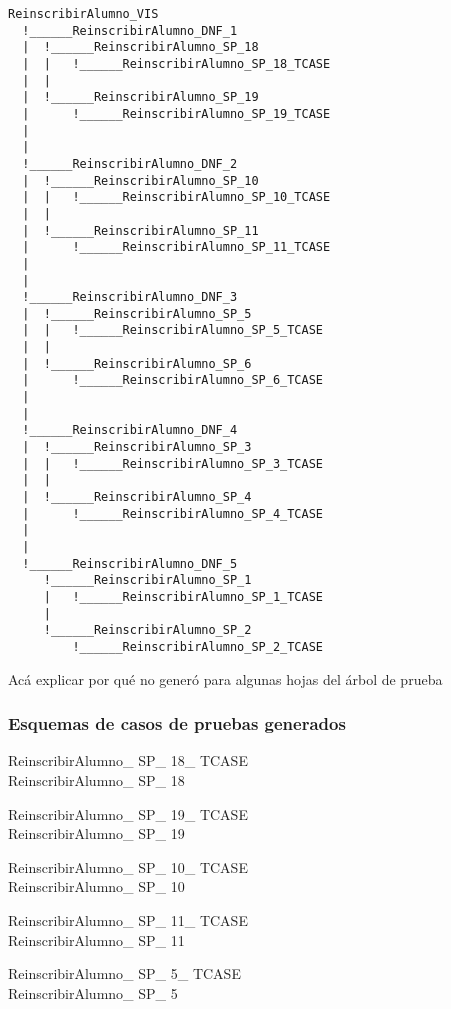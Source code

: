 \documentclass{article}
\begin{document}
\begin{verbatim}
ReinscribirAlumno_VIS
  !______ReinscribirAlumno_DNF_1
  |	 !______ReinscribirAlumno_SP_18
  |	 |	 !______ReinscribirAlumno_SP_18_TCASE
  |	 |
  |	 !______ReinscribirAlumno_SP_19
  |	 	 !______ReinscribirAlumno_SP_19_TCASE
  |	
  |
  !______ReinscribirAlumno_DNF_2
  |	 !______ReinscribirAlumno_SP_10
  |	 |	 !______ReinscribirAlumno_SP_10_TCASE
  |	 |
  |	 !______ReinscribirAlumno_SP_11
  |	 	 !______ReinscribirAlumno_SP_11_TCASE
  |	
  |
  !______ReinscribirAlumno_DNF_3
  |	 !______ReinscribirAlumno_SP_5
  |	 |	 !______ReinscribirAlumno_SP_5_TCASE
  |	 |
  |	 !______ReinscribirAlumno_SP_6
  |	 	 !______ReinscribirAlumno_SP_6_TCASE
  |	
  |
  !______ReinscribirAlumno_DNF_4
  |	 !______ReinscribirAlumno_SP_3
  |	 |	 !______ReinscribirAlumno_SP_3_TCASE
  |	 |
  |	 !______ReinscribirAlumno_SP_4
  |	 	 !______ReinscribirAlumno_SP_4_TCASE
  |	
  |
  !______ReinscribirAlumno_DNF_5
  	 !______ReinscribirAlumno_SP_1
  	 |	 !______ReinscribirAlumno_SP_1_TCASE
  	 |
  	 !______ReinscribirAlumno_SP_2
  	 	 !______ReinscribirAlumno_SP_2_TCASE
\end{verbatim}

Acá explicar por qué no generó para algunas hojas del árbol de prueba

\subsubsection*{Esquemas de casos de pruebas generados}

\begin{schema}{ReinscribirAlumno\_ SP\_ 18\_ TCASE}\\
 ReinscribirAlumno\_ SP\_ 18
\end{schema}


\begin{schema}{ReinscribirAlumno\_ SP\_ 19\_ TCASE}\\
 ReinscribirAlumno\_ SP\_ 19
\end{schema}


\begin{schema}{ReinscribirAlumno\_ SP\_ 10\_ TCASE}\\
 ReinscribirAlumno\_ SP\_ 10
\end{schema}


\begin{schema}{ReinscribirAlumno\_ SP\_ 11\_ TCASE}\\
 ReinscribirAlumno\_ SP\_ 11
\end{schema}


\begin{schema}{ReinscribirAlumno\_ SP\_ 5\_ TCASE}\\
 ReinscribirAlumno\_ SP\_ 5
\end{schema}
\end{document}
